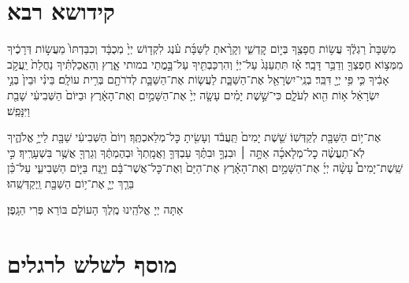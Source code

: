 \documentclass[twoside, openany, parskip=half, 11pt]{book}
\begin{document}
%

\mournerskaddish
\adonolam

\chapter[קידושא רבא לשבת]{ קידושא רבא }

מִשַּׁבָּת֙ רַגְלֶ֔ךָ עֲשׂ֥וֹת חֲפָצֶ֖ךָ בְּי֣וֹם קׇדְשִׁ֑י וְקָרָ֨אתָ לַשַּׁבָּ֜ת עֹ֗נֶג לִקְד֤וֹשׁ יְיָ֙ מְכֻבָּ֔ד וְכִבַּדְתּוֹ֙ מֵעֲשׂ֣וֹת דְּרָכֶ֔יךָ מִמְּצ֥וֹא חֶפְצְךָ֖ וְדַבֵּ֥ר דָּבָֽר׃ אָ֗ז תִּתְעַנַּג֙ עַל־יְיָ֔ וְהִרְכַּבְתִּ֖יךָ עַל־בָּ֣מֳתֵי במותי אָ֑רֶץ וְהַאֲכַלְתִּ֗יךָ נַחֲלַת֙ יַֽעֲקֹ֣ב אָבִ֔יךָ כִּ֛י פִּ֥י יְיָ֖ דִּבֵּֽר׃
בְנֵֽי־יִשְׂרָאֵ֖ל אֶת־הַשַּׁבָּ֑ת לַעֲשׂ֧וֹת אֶת־הַשַּׁבָּ֛ת לְדֹרֹתָ֖ם בְּרִ֥ית עוֹלָֽם׃ בֵּינִ֗י וּבֵין֙ בְּנֵ֣י יִשְׂרָאֵ֔ל א֥וֹת הִ֖וא לְעֹלָ֑ם כִּי־שֵׁ֣שֶׁת יָמִ֗ים עָשָׂ֤ה יְיָ֙ אֶת־הַשָּׁמַ֣יִם וְאֶת־הָאָ֔רֶץ וּבַיּוֹם֙ הַשְּׁבִיעִ֔י שָׁבַ֖ת וַיִּנָּפַֽשׁ׃

אֶת־י֥וֹם הַשַּׁבָּ֖ת לְקַדְּשֽׁוֹ׃ שֵׁ֤שֶׁת יָמִים֙ תַּֽעֲבֹ֔ד וְעָשִׂ֖יתָ כׇּל־מְלַאכְתֶּֽךָ׃ וְיוֹם֙ הַשְּׁבִיעִ֔י שַׁבָּ֖ת לַייָ֣ אֱלֹהֶ֑יךָ לֹֽא־תַעֲשֶׂ֨ה כׇל־מְלָאכָ֜ה אַתָּ֣ה ׀ וּבִנְךָ֣ וּבִתֶּ֗ךָ עַבְדְּךָ֤ וַאֲמָֽתְךָ֙ וּבְהֶמְתֶּ֔ךָ וְגֵרְךָ֖ אֲשֶׁ֥ר בִּשְׁעָרֶֽיךָ׃ כִּ֣י שֵֽׁשֶׁת־יָמִים֩ עָשָׂ֨ה יְיָ֜ אֶת־הַשָּׁמַ֣יִם וְאֶת־הָאָ֗רֶץ אֶת־הַיָּם֙ וְאֶת־כׇּל־אֲשֶׁר־בָּ֔ם וַיָּ֖נַח בַּיּ֣וֹם הַשְּׁבִיעִ֑י עַל־כֵּ֗ן בֵּרַ֧ךְ יְיָ֛ אֶת־י֥וֹם הַשַּׁבָּ֖ת וַֽיְקַדְּשֵֽׁהוּ׃

\savri
{}
אַתָּה יְיָ אֱלֹהֵֽינוּ מֶֽלֶךְ הָעוֹלָם בּוֹרֵא פְּרִי הַגָֽפֶן׃

\chapter[מוסף לשלש רגלים]{ מוסף לשלש לרגלים ‎}
\label{musaphregel}


\specialsaavos

\specialsameisim

\nextpage
\end{document}
